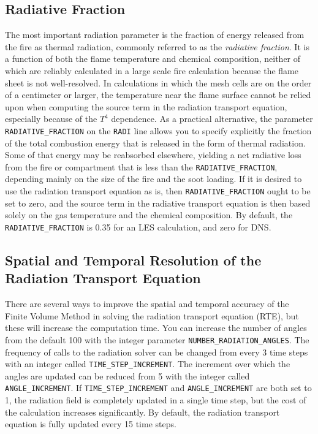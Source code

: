 \documentclass[11pt]{book}
\newcommand{\ct}{\tt\small}
\begin{document}
\subsection{Radiative Fraction}

The most important radiation parameter is the fraction of energy released from the
fire as thermal radiation, commonly referred to as the {\em radiative fraction}. It is a function of both the flame temperature
and chemical composition, neither of which are reliably calculated in a large
scale fire calculation because the flame sheet is not well-resolved.
In calculations in which the mesh cells are on the order of a centimeter or
larger, the temperature near the flame surface cannot be relied upon when
computing the source term in the radiation transport equation, especially
because of the $T^4$ dependence.
As a practical alternative, the parameter {\ct RADIATIVE\_FRACTION} on the {\ct RADI} line allows you to specify explicitly the
fraction of the total combustion energy that is released in the form of thermal radiation.
Some of that energy may be reabsorbed elsewhere, yielding a net radiative
loss from the fire or compartment that is less than the {\ct RADIATIVE\_FRACTION}, depending mainly on the size of
the fire and the soot loading. If it is desired to use the radiation transport
equation as is, then {\ct RADIATIVE\_FRACTION} ought to be set to zero,
and the source term in the radiative transport equation is then based solely
on the gas temperature and the chemical composition. By default, the {\ct RADIATIVE\_FRACTION} is
0.35 for an LES calculation, and zero for DNS.


\subsection{Spatial and Temporal Resolution of the Radiation Transport Equation}

\label{info:RADI_Resolution}

There are several ways to improve the spatial and temporal accuracy of the Finite Volume
Method in solving the radiation transport equation (RTE), but these will
increase the computation time. You can increase the number
of angles from the default 100 with the integer parameter
{\ct NUMBER\_RADIATION\_ANGLES}. The frequency of calls to the radiation
solver can be changed from every 3 time steps with an integer called
{\ct TIME\_STEP\_INCREMENT}. The increment over which the angles are
updated can be reduced from 5 with the integer called {\ct ANGLE\_INCREMENT}.
If {\ct TIME\_STEP\_INCREMENT} and {\ct ANGLE\_INCREMENT} are
both set to 1, the radiation field is completely updated in a single
time step, but the cost of the calculation increases significantly. By default,
the radiation transport equation is fully updated every 15 time steps.
\end{document}
